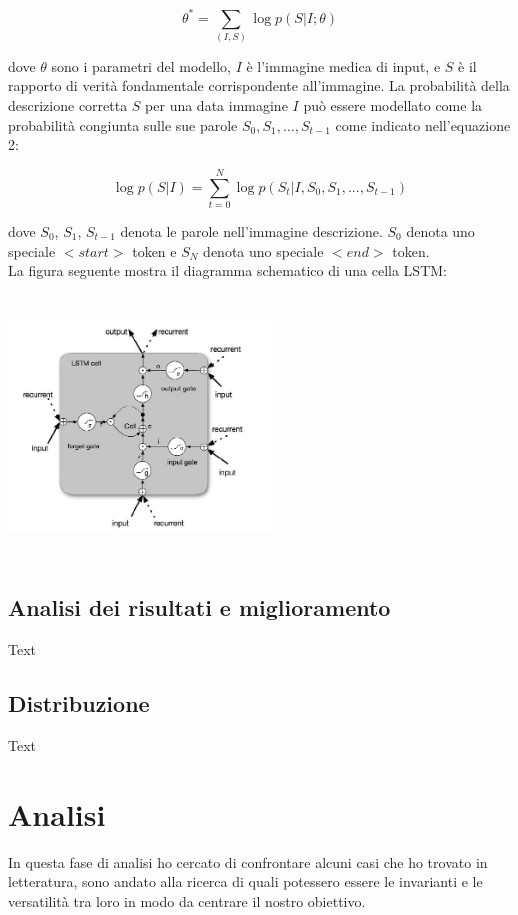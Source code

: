 \documentclass[12pt,a4paper]{report}
\begin{document}
\begin{equation}
{\displaystyle \theta^* =  \sum\limits_{(I, S)} \log p(S | I; \theta)}
\end{equation}

dove $\theta$ sono i parametri del modello, $I$ è l'immagine medica di input, e $S$ è il rapporto di verità fondamentale corrispondente all'immagine. La probabilità della descrizione corretta $S$ per una data immagine $I$ può essere modellato come la probabilità congiunta sulle sue parole $S_0, S_1, … ,S_{t-1}$ come indicato nell'equazione 2:

\begin{equation}
{\displaystyle \log p(S|I) =  \sum\limits_{t = 0}^{N} \log p(S_t | I, S_0, S_1, ..., S_{t-1})}
\end{equation}

dove $S_0$, $S_1$, $S_{t-1}$ denota le parole nell'immagine descrizione. $S_0$ denota uno speciale $<start>$ token e $S_N$ denota uno speciale $<end>$ token.\\
La figura seguente mostra il diagramma schematico di una cella LSTM:

\begin{center}
\includegraphics[width=7cm,height=7cm,keepaspectratio]{diagram_LSTM}
\end{center}


\subsection{Analisi dei risultati e miglioramento}
Text

\subsection{Distribuzione}
Text

\section{Analisi}
In questa fase di analisi ho cercato di confrontare alcuni casi che ho trovato in letteratura, sono andato alla ricerca di quali potessero essere le invarianti e le versatilità tra loro in modo da centrare il nostro obiettivo.
\end{document}
